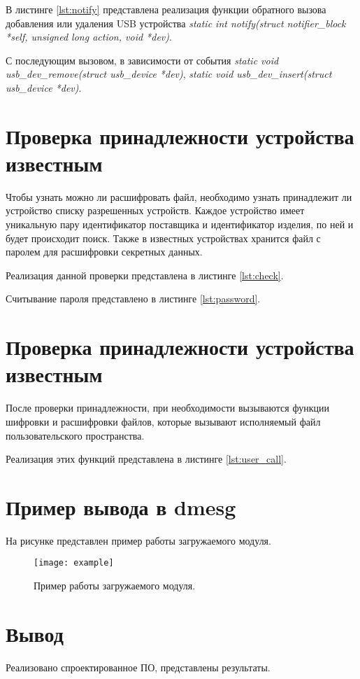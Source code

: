 В листинге \ref{lst:notify} представлена реализация функции обратного вызова добавления или удаления USB устройства \textit{static int notify(struct notifier\_block *self, unsigned long action, void *dev)}. 

С последующим вызовом, в зависимости от события \textit{static void usb\_dev\_remove(struct usb\_device *dev)}, \textit{static void usb\_dev\_insert(struct usb\_device *dev)}.

\section{\textbf{Проверка принадлежности устройства известным }}

Чтобы узнать можно ли расшифровать файл, необходимо узнать принадлежит ли устройство списку разрешенных устройств. Каждое устройство имеет уникальную пару идентификатор поставщика и идентификатор изделия, по ней и будет происходит поиск. Также в известных устройствах хранится файл с паролем для расшифровки секретных данных.

Реализация данной проверки представлена в листинге \ref{lst:check}.

Считывание пароля представлено в листинге \ref{lst:password}.

\section{\textbf{Проверка принадлежности устройства известным }}

После проверки принадлежности, при необходимости вызываются функции шифровки и расшифровки файлов, которые вызывают исполняемый файл пользовательского пространства.

Реализация этих функций представлена в листинге \ref{lst:user_call}.

\section{\textbf{Пример вывода в dmesg }}

На рисунке представлен пример работы загружаемого модуля.

\begin{figure}[H]
	\centering
	\texttt{[image: example]}
	\caption{Пример работы загружаемого модуля. }
	\label{img:example}
\end{figure}

\section{\textbf{Вывод}}

Реализовано спроектированное ПО, представлены результаты. 
